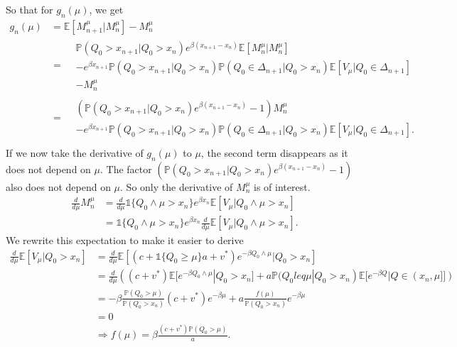 So that for $g_n(\mu)$, we get
\begin{equation}
\begin{split}
g_n(\mu)&=\mathbb{E}[M_{n+1}^\mu|M_n^\mu]-M_n^\mu\\
&=\begin{split}
&\mathbb{P}(Q_0>x_{n+1}|Q_0>x_n)e^{\beta(x_{n+1}-x_n)}\mathbb{E}[M_n^\mu|M_n^\mu]\\
&-e^{\beta x_{n+1}}\mathbb{P}(Q_0>x_{n+1}|Q_0>x_n)\mathbb{P}(Q_0\in\Delta_{n+1}|Q_0>x_n)\mathbb{E}[V_\mu|Q_0\in\Delta_{n+1}]\\
&-M_n^\mu
\end{split}\\
&=\begin{split}
&(\mathbb{P}(Q_0>x_{n+1}|Q_0>x_n)e^{\beta(x_{n+1}-x_n)}-1)M_n^\mu\\
&-e^{\beta x_{n+1}}\mathbb{P}(Q_0>x_{n+1}|Q_0>x_n)\mathbb{P}(Q_0\in\Delta_{n+1}|Q_0>x_n)\mathbb{E}[V_\mu|Q_0\in\Delta_{n+1}].
\end{split}\\
\end{split}
\end{equation}
If we now take the derivative of $g_n(\mu)$ to $\mu$, the second term disappears as it does not depend on $\mu$.
The factor $(\mathbb{P}(Q_0>x_{n+1}|Q_0>x_n)e^{\beta(x_{n+1}-x_n)}-1)$ also does not depend on $\mu$.
So only the derivative of $M_n^\mu$ is of interest.
\begin{equation}
\begin{split}
\frac{d}{d\mu}M_n^\mu&=\frac{d}{d\mu}\mathds{1}\{Q_0\wedge\mu>x_n\}e^{\beta x_n}\mathbb{E}[V_\mu|Q_0\wedge\mu>x_n]\\
&=\mathds{1}\{Q_0\wedge\mu>x_n\}e^{\beta x_n}\frac{d}{d\mu}\mathbb{E}[V_\mu|Q_0\wedge\mu>x_n].
\end{split}
\end{equation}
We rewrite this expectation to make it easier to derive
\begin{equation}
\begin{split}
\frac{d}{d\mu}\mathbb{E}[V_\mu|Q_0>x_n]&=\frac{d}{d\mu}\mathbb{E}[(c+\mathds{1}\{Q_0\geq\mu\}a+v^*)e^{-\beta Q_0\wedge\mu}|Q_0>x_n]\\
&=\frac{d}{d\mu}((c+v^*)\mathbb{E}[e^{-\beta Q_0\wedge\mu}|Q_0>x_n]+a\mathbb{P}(Q_0leq\mu|Q_0>x_n)\mathbb{E}[e^{-\beta Q}|Q\in(x_n,\mu]])\\
&=-\beta\frac{\mathbb{P}(Q_0>\mu)}{\mathbb{P}(Q_0>x_n)}(c+v^*)e^{-\beta\mu}+a \frac{f(\mu)}{\mathbb{P}(Q_0>x_n)}e^{-\beta\mu}\\
&=0\\
&\Rightarrow f(\mu)=\beta\frac{(c+v^*)\mathbb{P}(Q_0>\mu)}{a}.
\end{split}
\end{equation}
